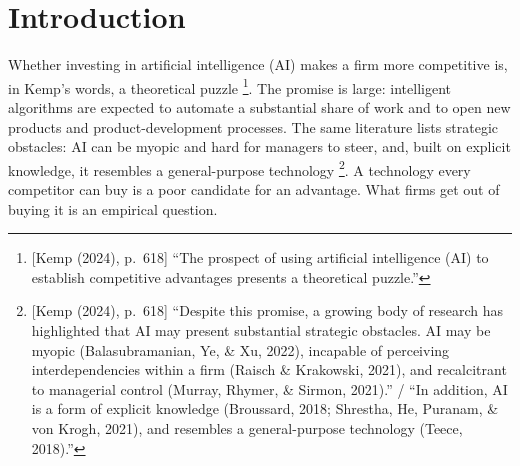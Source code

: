 \chapter{Introduction}
\label{sec:introduction}

Whether investing in artificial intelligence (AI) makes a firm more competitive is, in
Kemp's words, a theoretical puzzle \parencite[p.~618]{kemp2024competitive}\footnote{[Kemp
(2024), p.~618] ``The prospect of using artificial intelligence (AI) to establish
competitive advantages presents a theoretical puzzle.''}. The promise is large:
intelligent algorithms are expected to automate a substantial share of work and to open
new products and product-development processes. The same literature lists strategic
obstacles: AI can be myopic and hard for managers to steer, and, built on explicit
knowledge, it resembles a general-purpose
technology \parencite[p.~618]{kemp2024competitive}\footnote{[Kemp (2024), p.~618]
``Despite this promise, a growing body of research has highlighted that AI may present
substantial strategic obstacles. AI may be myopic (Balasubramanian, Ye, \& Xu, 2022),
incapable of perceiving interdependencies within a firm (Raisch \& Krakowski, 2021), and
recalcitrant to managerial control (Murray, Rhymer, \& Sirmon, 2021).'' / ``In addition,
AI is a form of explicit knowledge (Broussard, 2018; Shrestha, He, Puranam, \& von
Krogh, 2021), and resembles a general-purpose technology (Teece, 2018).''}. A
technology every competitor can buy is a poor candidate for an advantage. What firms
get out of buying it is an empirical question.

